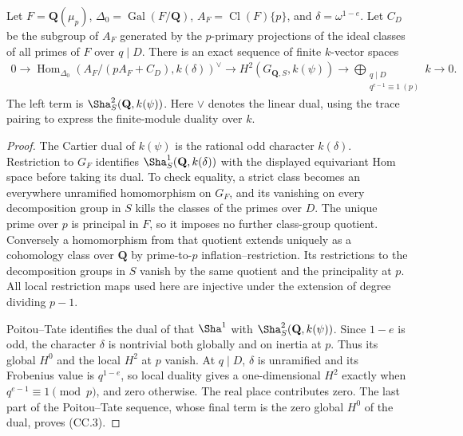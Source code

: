 \begin{lemma}
Let $F=\mathbf Q(\mu_p)$, $\Delta_0=\operatorname{Gal}(F/\mathbf Q)$,
$A_F=\operatorname{Cl}(F)\{p\}$, and $\delta=\omega^{1-e}$.
Let $C_D$ be the subgroup of $A_F$ generated by the $p$-primary
projections of the ideal classes of all primes of $F$ over $q\mid D$.
There is an exact sequence of finite $k$-vector spaces
\[
\begin{split}
0\longrightarrow
 \operatorname{Hom}_{\Delta_0}
   (A_F/(pA_F+C_D),k(\delta))^\vee
\longrightarrow H^2(G_{\mathbf Q,S},k(\psi))
\longrightarrow
 \bigoplus_{\substack{q\mid D\\q^{e-1}\equiv1\ (p)}}k
\longrightarrow0 .
\end{split}                                               \tag{CC.3}
\]
The left term is $\Sha^2_S(\mathbf Q,k(\psi))$.
Here $\vee$ denotes the linear dual, using the trace pairing
to express the finite-module duality over $k$.
\end{lemma}
\begin{proof}
The Cartier dual of $k(\psi)$ is the rational odd character
$k(\delta)$.  Restriction to $G_F$ identifies
$\Sha^1_S(\mathbf Q,k(\delta))$ with the displayed equivariant
Hom space before taking its dual.  To check equality, a strict
class becomes an everywhere unramified homomorphism on $G_F$,
and its vanishing on every decomposition group in $S$ kills the
classes of the primes over $D$.  The unique prime over $p$ is
principal in $F$, so it imposes no further class-group quotient.
Conversely a homomorphism from that quotient extends uniquely
as a cohomology class over $\mathbf Q$ by prime-to-$p$
inflation--restriction.  Its restrictions to the decomposition
groups in $S$ vanish by the same quotient and the principality
at $p$.  All local restriction maps used here are injective
under the extension of degree dividing $p-1$.

Poitou--Tate identifies the dual of that $\Sha^1$ with
$\Sha^2_S(\mathbf Q,k(\psi))$.  Since $1-e$ is odd, the
character $\delta$ is nontrivial both globally and on inertia
at $p$.  Thus its global $H^0$ and the local $H^2$ at $p$
vanish.  At $q\mid D$, $\delta$ is unramified and its Frobenius
value is $q^{1-e}$, so local duality gives a one-dimensional
$H^2$ exactly when $q^{e-1}\equiv1\pmod p$, and zero otherwise.
The real place contributes zero.  The last part of the
Poitou--Tate sequence, whose final term is the zero global
$H^0$ of the dual, proves (CC.3).
\end{proof}

